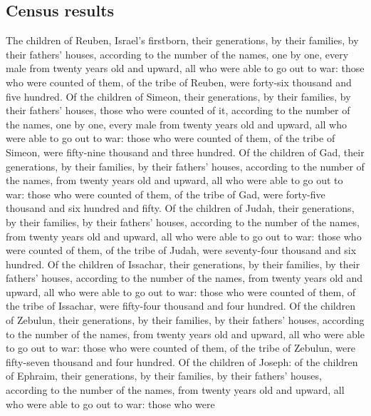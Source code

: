 \hypertarget{census-results}{%
\subsection{Census results}\label{census-results}}

 The children of Reuben, Israel's firstborn, their
generations, by their families, by their fathers' houses, according to
the number of the names, one by one, every male from twenty years old
and upward, all who were able to go out to war:  those
who were counted of them, of the tribe of Reuben, were forty-six
thousand and five hundred.  Of the children of Simeon,
their generations, by their families, by their fathers' houses, those
who were counted of it, according to the number of the names, one by
one, every male from twenty years old and upward, all who were able to
go out to war:  those who were counted of them, of the
tribe of Simeon, were fifty-nine thousand and three hundred.
 Of the children of Gad, their generations, by their
families, by their fathers' houses, according to the number of the
names, from twenty years old and upward, all who were able to go out to
war:  those who were counted of them, of the tribe of
Gad, were forty-five thousand and six hundred and fifty. 
Of the children of Judah, their generations, by their families, by their
fathers' houses, according to the number of the names, from twenty years
old and upward, all who were able to go out to war: 
those who were counted of them, of the tribe of Judah, were seventy-four
thousand and six hundred.  Of the children of Issachar,
their generations, by their families, by their fathers' houses,
according to the number of the names, from twenty years old and upward,
all who were able to go out to war:  those who were
counted of them, of the tribe of Issachar, were fifty-four thousand and
four hundred.  Of the children of Zebulun, their
generations, by their families, by their fathers' houses, according to
the number of the names, from twenty years old and upward, all who were
able to go out to war:  those who were counted of them,
of the tribe of Zebulun, were fifty-seven thousand and four hundred.
 Of the children of Joseph: of the children of Ephraim,
their generations, by their families, by their fathers' houses,
according to the number of the names, from twenty years old and upward,
all who were able to go out to war:  those who were
